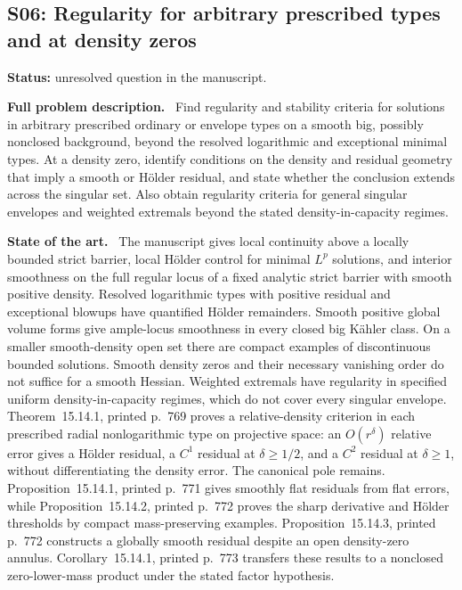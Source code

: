 \documentclass[11pt]{article}
\newcommand{\field}[1]{\par\medskip\noindent\textbf{#1.}\ }
\begin{document}
\subsection{S06: Regularity for arbitrary prescribed types and at density zeros}
\label{S06}
\noindent\textbf{Status:} unresolved question in the manuscript.
\field{Full problem description} Find regularity and stability criteria for solutions in arbitrary prescribed ordinary or envelope types on a smooth big, possibly nonclosed background, beyond the resolved logarithmic and exceptional minimal types. At a density zero, identify conditions on the density and residual geometry that imply a smooth or H\"older residual, and state whether the conclusion extends across the singular set. Also obtain regularity criteria for general singular envelopes and weighted extremals beyond the stated density-in-capacity regimes.
\field{State of the art} The manuscript gives local continuity above a locally bounded strict barrier, local H\"older control for minimal $L^p$ solutions, and interior smoothness on the full regular locus of a fixed analytic strict barrier with smooth positive density. Resolved logarithmic types with positive residual and exceptional blowups have quantified H\"older remainders. Smooth positive global volume forms give ample-locus smoothness in every closed big K\"ahler class. On a smaller smooth-density open set there are compact examples of discontinuous bounded solutions. Smooth density zeros and their necessary vanishing order do not suffice for a smooth Hessian. Weighted extremals have regularity in specified uniform density-in-capacity regimes, which do not cover every singular envelope. Theorem~15.14.1, printed p.~769 proves a relative-density criterion in each prescribed radial nonlogarithmic type on projective space: an $O(r^\delta)$ relative error gives a H\"older residual, a $C^1$ residual at $\delta\ge1/2$, and a $C^2$ residual at $\delta\ge1$, without differentiating the density error. The canonical pole remains. Proposition~15.14.1, printed p.~771 gives smoothly flat residuals from flat errors, while Proposition~15.14.2, printed p.~772 proves the sharp derivative and H\"older thresholds by compact mass-preserving examples. Proposition~15.14.3, printed p.~772 constructs a globally smooth residual despite an open density-zero annulus. Corollary~15.14.1, printed p.~773 transfers these results to a nonclosed zero-lower-mass product under the stated factor hypothesis.
\end{document}
